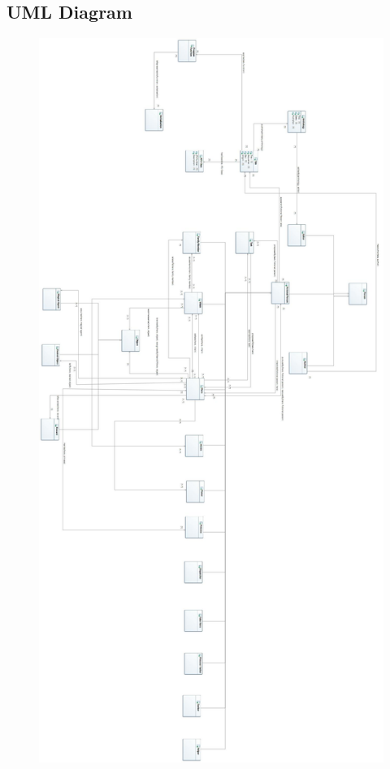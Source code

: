 \documentclass[10pt,a4paper]{article}
\begin{document}
\subsection{UML Diagram}
\begin{figure} [H]
\centering
	\includegraphics[scale=0.225]{UML.jpg}
\end{figure}
\end{document}
